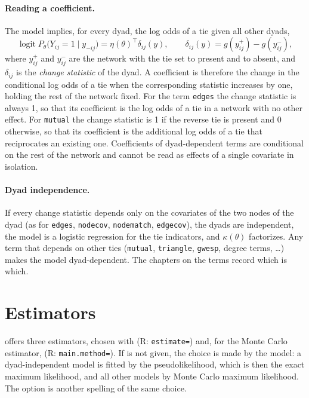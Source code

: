\paragraph{Reading a coefficient.} The model implies, for every dyad, the log odds of a tie given all other dyads,
\begin{equation}\label{eq:condlogit}
  \operatorname{logit}P_\theta\bigl(Y_{ij}=1\mid y_{-ij}\bigr)=\eta(\theta)^{\top}\delta_{ij}(y),\qquad
  \delta_{ij}(y)=g(y_{ij}^{+})-g(y_{ij}^{-}),
\end{equation}
where $y_{ij}^{+}$ and $y_{ij}^{-}$ are the network with the tie set to present and to absent, and $\delta_{ij}$ is the \emph{change statistic} of the dyad. A coefficient is therefore the change in the conditional log odds of a tie when the corresponding statistic increases by one, holding the rest of the network fixed. For the term \texttt{edges} the change statistic is always 1, so that its coefficient is the log odds of a tie in a network with no other effect. For \texttt{mutual} the change statistic is 1 if the reverse tie is present and 0 otherwise, so that its coefficient is the additional log odds of a tie that reciprocates an existing one. Coefficients of dyad-dependent terms are conditional on the rest of the network and cannot be read as effects of a single covariate in isolation.

\paragraph{Dyad independence.} If every change statistic depends only on the covariates of the two nodes of the dyad (as for \texttt{edges}, \texttt{nodecov}, \texttt{nodematch}, \texttt{edgecov}), the dyads are independent, the model is a logistic regression for the tie indicators, and $\kappa(\theta)$ factorizes. Any term that depends on other ties (\texttt{mutual}, \texttt{triangle}, \texttt{gwesp}, degree terms, \ldots) makes the model dyad-dependent. The chapters on the terms record which is which.

\section{Estimators}\label{sec:estimators}

\nwergm{} offers three estimators, chosen with  (R: \texttt{estimate=}) and, for the Monte Carlo estimator,  (R: \texttt{main.method=}). If  is not given, the choice is made by the model: a dyad-independent model is fitted by the pseudolikelihood, which is then the exact maximum likelihood, and all other models by Monte Carlo maximum likelihood. The option  is another spelling of the same choice.

